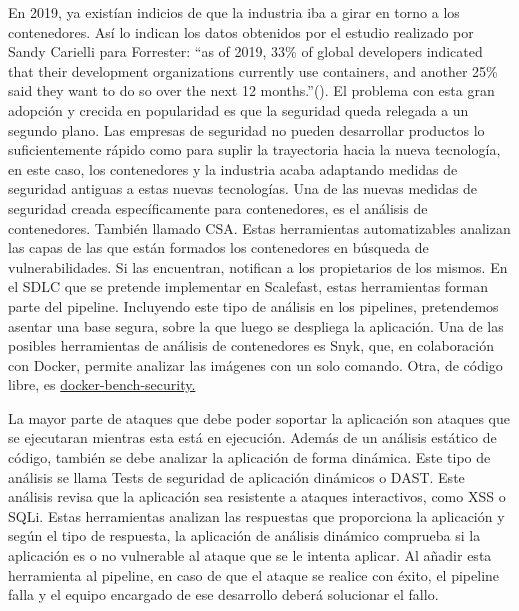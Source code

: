 \documentclass[12pt]{report} %
\begin{document}
En 2019, ya existían indicios de que la industria iba a girar en torno a los
contenedores.
Así lo indican los datos obtenidos por el estudio realizado por Sandy Carielli
para Forrester:
``as of 2019, 33\% of global developers indicated that their development
organizations currently use containers, and another 25\% said they want to do so
over the next 12 months.''(\cite{Carielli2020}).
El problema con esta gran adopción y crecida en popularidad es que la seguridad
queda relegada a un segundo plano.
Las empresas de seguridad no pueden desarrollar productos lo suficientemente
rápido como para suplir la trayectoria hacia la nueva tecnología, en este caso,
los contenedores y la industria acaba adaptando medidas de seguridad antiguas a
estas nuevas tecnologías.
Una de las nuevas medidas de seguridad creada específicamente para contenedores,
es el análisis de contenedores.
También llamado \gls{CSA}.
Estas herramientas automatizables analizan las capas de las que están formados los
contenedores en búsqueda de vulnerabilidades.
Si las encuentran, notifican a los propietarios de los mismos.
En el \gls{SDLC} que se pretende implementar en Scalefast, estas herramientas
forman parte del \gls{pipeline}.
Incluyendo este tipo de análisis en los \gls{pipeline}s, pretendemos asentar una
base segura, sobre la que luego se despliega la aplicación. 
Una de las posibles herramientas de análisis de contenedores es Snyk, que, en
colaboración con Docker, permite analizar las imágenes con un solo comando.
Otra, de código libre, es \href{https://github.com/docker/docker-bench-security}{docker-bench-security.}

La mayor parte de ataques que debe poder soportar la aplicación son ataques que
se ejecutaran mientras esta está en ejecución.
Además de un análisis estático de código, también se debe analizar la aplicación
de forma dinámica.
Este tipo de análisis se llama Tests de seguridad de aplicación
dinámicos o \gls{DAST}.
Este análisis revisa que la aplicación sea resistente a ataques interactivos,
como \gls{XSS} o \gls{SQLi}.
Estas herramientas analizan las respuestas que proporciona la aplicación y
según el tipo de respuesta, la aplicación de análisis dinámico comprueba si la
aplicación es o no vulnerable al ataque que se le intenta aplicar.
Al añadir esta herramienta al \gls{pipeline}, en caso de que el ataque se
realice con éxito, el \gls{pipeline} falla y el equipo encargado de ese
desarrollo deberá solucionar el fallo.
\end{document}
